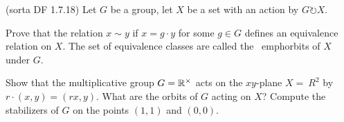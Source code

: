 

\begin{problem} \textsf{(sorta DF 1.7.18)}
  Let $G$ be a group, let $X$ be a set with an action by $G \circlearrowright X$.  
  \begin{enumalph}
    \item Prove that the relation $x \sim y$ if $x=g\cdot y$ for some $g \in G$ defines
    an equivalence relation on $X$.  The set of equivalence classes are called the \
    emph{orbits} of $X$ under $G$.  
    \item Show that the multiplicative group $G=\mathbb{R}^\times$ acts on the $xy$-plane $X=\
    R^2$ by $r \cdot (x,y) = (rx,y)$.  What are the orbits of $G$ acting on $X$?  
    Compute the stabilizers of $G$ on the points $(1,1)$ and $(0,0)$.  
  \end{enumalph}
\end{problem}
